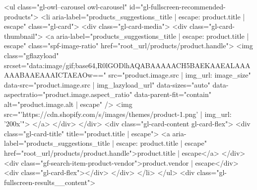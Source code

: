 {{{{{{{{{{{{{{{{{{{{{{{{{{{{{{{{{{{{{{{{{{{{{{{{{{{{{{{{{{{{{{{{{{{{{{{{{{{{{{{{{{{{{{{{{{{{{{{{{{{{{{{{{{{{{{{{{{                    <ul class="gl-owl--carousel owl-carousel" id="gl-fullscreen-recommended-products">
                      {%
                      <li aria-label="{{products_suggestions_title | escape}}: {{product.title | escape}}" class="gl-card">
                        <div class="gl-card-media">
                          <div class="gl-card-thumbnail">
                            <a aria-label="{{products_suggestions_title | escape}}: {{product.title | escape}}" class="spf-image-ratio" href="{{root_url}}/products/{{product.handle}}">
                              {%
                              <img 
                                class="gflazyload"
                                srcset="data:image/gif;base64,R0lGODlhAQABAAAAACH5BAEKAAEALAAAAAABAAEAAAICTAEAOw=="
                                src="{{product.image.src | img_url: image_size}}"
                                data-src="{{product.image.src | img_lazyload_url}}"
                                data-sizes="auto"
                                data-aspectratio="{{product.image.aspect_ratio}}"
                                data-parent-fit="contain"
                                alt="{{product.image.alt | escape}}"
                              />
                              {%
                              <img src="{{'https://cdn.shopify.com/s/images/themes/product-1.png' | img_url: '200x'}}">
                              {%
                            </a>
                          </div>
                        </div>
                        <div class="gl-card-content gl-card-flex">
                          <div class="gl-card-title" title="{{product.title | escape}}">
                            <a aria-label="{{products_suggestions_title | escape}}: {{product.title | escape}}" href="{{root_url}}/products/{{product.handle}}">{{product.title | escape}}</a>
                          </div>
                                                    {%
                          <div class="gf-search-item-product-vendor">{{product.vendor | escape}}</div>
                          {%
                                                                                                        <div class="gl-card-flex"></div>
                                                  </div>
                      </li>
                      {%
                    </ul>
                    {%
                    <div class="gl-fullscreen-results__content">
                      {%
}}}}}}}}}}}}}}}}}}}}}}}}}}}}}}}}}}}}}}}}}}}}}}}}}}}}}}}}}}}}}}}}}}}}}}}}}}}}}}}}}}}}}}}}}}}}}}}}}}}}}}}}}}}}}}}}}}}}}}}}}}}
